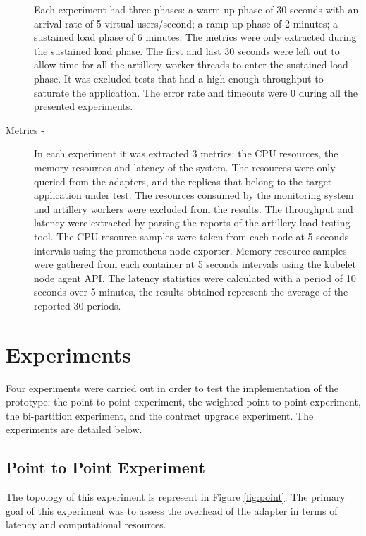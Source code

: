\begin{description}
    Each experiment had three phases:
    a warm up phase of 30 seconds with an arrival rate of 5 virtual users/second;
    a ramp up phase of 2 minutes;
    a sustained load phase of 6 minutes.
    The metrics were only extracted during the sustained load phase.
    The first and last 30 seconds were left out to allow time for all the artillery worker threads to enter the sustained load phase.
    It was excluded tests that had a high enough throughput to saturate the application.
    The error rate and timeouts were 0 during all the presented experiments.
    \item[Metrics -] In each experiment it was extracted 3 metrics: the CPU resources, the memory resources and latency of the system.
    The resources were only queried from the adapters, and the replicas that belong to the target application under test.
    The resources consumed by the monitoring system and artillery workers were excluded from the results.
    The throughput and latency were extracted by parsing the reports of the artillery load testing tool.
    The CPU resource samples were taken from each node at 5 seconds intervals using the prometheus node exporter.
    Memory resource samples were gathered from each container at 5 seconds intervals using the kubelet node agent API.
    The latency statistics were calculated with a period of 10 seconds over 5 minutes, the results obtained represent the
    average of the reported 30 periods.
    \item[]
\end{description}

\section{Experiments} %
\label{sec:experiments}

Four experiments were carried out in order to test the implementation of the prototype:
the point-to-point experiment, the weighted point-to-point experiment, the bi-partition experiment, and the contract upgrade experiment.
The experiments are detailed below.

\subsection{Point to Point Experiment}

The topology of this experiment is represent in Figure \ref{fig:point}.
The primary goal of this experiment was to assess the overhead of the adapter in terms of latency and computational resources.

